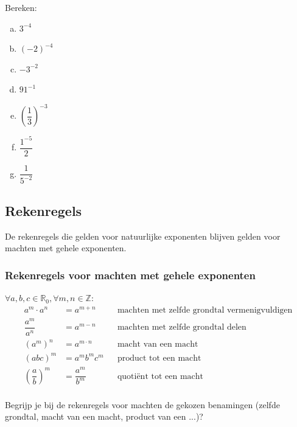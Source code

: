 \documentclass[12pt,twoside,a4paper]{article}
\begin{document}
\begin{oefening}
Bereken:
\begin{multicols}{3}
\begin{enumerate}[(a)]
  \itemsep1em
  \item $3^{-4}$
  \item $(-2)^{-4}$
  \item $-3^{-2}$
  \item $91^{-1}$
  \item $\left(\dfrac{1}{3}\right)^{-3}$
  \item $\dfrac{1^{-5}}{2}$
  \item $\dfrac{1}{5^{-2}}$
\end{enumerate}
\end{multicols}
\end{oefening}

\subsection{Rekenregels}

De rekenregels die gelden voor natuurlijke exponenten blijven gelden voor machten met gehele exponenten.

\subsubsection*{Rekenregels voor machten met gehele exponenten}
\begin{mdframed}
$\forall a, b, c \in \mathbb{R}_0, \forall m, n\in \mathbb{Z}:$
\begin{align*}
a^m\cdot a^n &= a^{m+n} && \mbox{machten met zelfde grondtal vermenigvuldigen}\\
\dfrac{a^m}{a^n} &= a^{m-n} && \mbox{machten met zelfde grondtal delen}\\
\left(a^m\right)^n &= a^{m\cdot n} && \mbox{macht van een macht}\\
\left(abc\right)^m &= a^mb^mc^m && \mbox{product tot een macht}\\
\left(\dfrac{a}{b}\right)^m &= \dfrac{a^m}{b^m} && \mbox{quotiënt tot een macht}\\
\end{align*}
\end{mdframed}

\begin{oefening}
Begrijp je bij de rekenregels voor machten de gekozen benamingen (zelfde grondtal, macht van een macht, product van een ...)?
\end{oefening}
\end{document}
